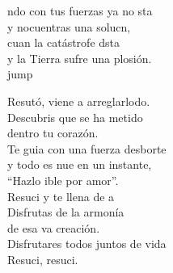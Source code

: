 \begin{cancion}
	ndo con tus fuerzas ya no sta\\
	y nocuentras una solucn,\\
	cuan la catástrofe dsta\\
	y la Tierra sufre una plosión.\\jump\\
	\begin{chorus}%
	Resutó, viene a arreglarlodo.\\
	Descubris que se ha metido  \\
	dentro tu corazón.\\
	Te guia con una fuerza desborte \\
	y todo es nue en un instante,\\
	“Hazlo ible por amor”.\\
	Resuci y te llena de a \\
	Disfrutas de la armonía  \\
	de esa va creación.\\
	Disfrutares todos juntos de vida\\
	Resuci, resuci. \\
	\end{chorus}%
	\jump\\
\end{cancion}%
